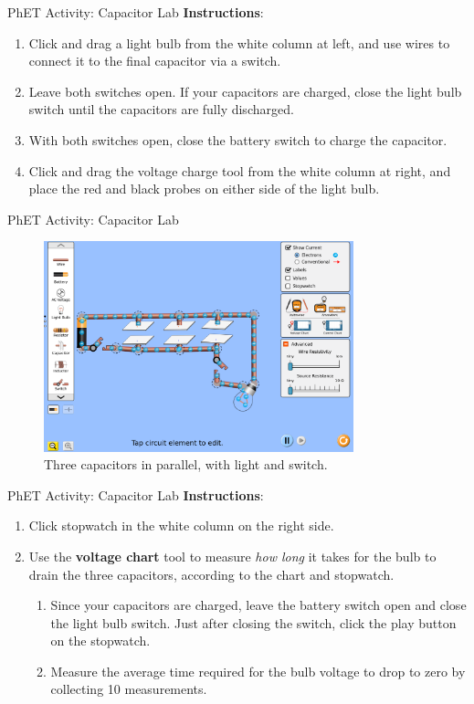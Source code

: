 \documentclass{beamer}
\begin{document}
\begin{frame}{PhET Activity: Capacitor Lab}
\small
\textbf{Instructions}:
\begin{enumerate}
\item Click and drag a light bulb from the white column at left, and use wires to connect it to the final capacitor via a switch.
\item Leave both switches open.  If your capacitors are charged, close the light bulb switch until the capacitors are fully discharged.
\item With both switches open, close the battery switch to charge the capacitor.
\item Click and drag the voltage charge tool from the white column at right, and place the red and black probes on either side of the light bulb.
\end{enumerate}
\end{frame}

\begin{frame}{PhET Activity: Capacitor Lab}
\begin{figure}
\centering
\includegraphics[width=0.8\textwidth]{figures/three_cap_2.png}
\caption{\label{fig:phet_cap2} Three capacitors in parallel, with light and switch.}
\end{figure}
\end{frame}

\begin{frame}{PhET Activity: Capacitor Lab}
\small
\textbf{Instructions}:
\begin{enumerate}
\item Click stopwatch in the white column on the right side.
\item Use the \textbf{\alert{voltage chart}} tool to measure \textit{how long} it takes for the bulb to drain the three capacitors, according to the chart and stopwatch.
\begin{enumerate}
\item Since your capacitors are charged, leave the battery switch open and close the light bulb switch.  Just after closing the switch, click the play button on the stopwatch.
\item Measure the average time required for the bulb voltage to drop to zero by collecting 10 measurements.
\end{enumerate}
\end{enumerate}
\end{frame}
\end{document}
